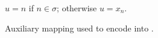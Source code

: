\begin{figure}[t]
$u = n$ if $n\in \sigma$; otherwise $u = x_n$. \\
\caption{\label{f:auxmap} Auxiliary mapping used to encode \HOp into \HO.}
\Hlinefig 
\end{figure}

